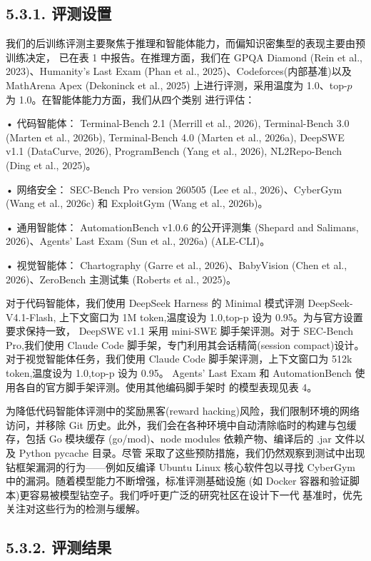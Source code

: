 \subsection{5.3.1. 评测设置}\label{evaluation-setup}

我们的后训练评测主要聚焦于推理和智能体能力，而偏知识密集型的表现主要由预训练决定，
已在表 1 中报告。在推理方面，我们在 GPQA Diamond (Rein et al., 2023)、Humanity's Last
Exam (Phan et al., 2025)、Codeforces(内部基准)以及 MathArena Apex (Dekoninck et al.,
2025) 上进行评测，采用温度为 1.0、top-$p$ 为 1.0。在智能体能力方面，我们从四个类别
进行评估：

• 代码智能体： Terminal-Bench 2.1 (Merrill et al., 2026), Terminal-Bench
3.0 (Marten et al., 2026b), Terminal-Bench 4.0 (Marten et al., 2026a),
DeepSWE v1.1 (DataCurve, 2026), ProgramBench (Yang et al., 2026),
NL2Repo-Bench (Ding et al., 2025)。

• 网络安全： SEC-Bench Pro version 260505 (Lee et al., 2026)、CyberGym
(Wang et al., 2026c) 和 ExploitGym (Wang et al., 2026b)。

• 通用智能体： AutomationBench v1.0.6 的公开评测集 (Shepard and
Salimans, 2026)、Agents' Last Exam (Sun et al., 2026a) (ALE-CLI)。

• 视觉智能体： Chartography (Garre et al., 2026)、BabyVision (Chen et
al., 2026)、ZeroBench 主测试集 (Roberts et al., 2025)。

对于代码智能体，我们使用 DeepSeek Harness 的 Minimal 模式评测 DeepSeek-V4.1-Flash,
上下文窗口为 1M token,温度设为 1.0,top-p 设为 0.95。为与官方设置要求保持一致，
DeepSWE v1.1 采用 mini-SWE 脚手架评测。对于 SEC-Bench Pro,我们使用 Claude Code
脚手架，专门利用其会话精简(session compact)设计。对于视觉智能体任务，我们使用
Claude Code 脚手架评测，上下文窗口为 512k token,温度设为 1.0,top-p 设为 0.95。
Agents' Last Exam 和 AutomationBench 使用各自的官方脚手架评测。使用其他编码脚手架时
的模型表现见表 4。

为降低代码智能体评测中的奖励黑客(reward hacking)风险，我们限制环境的网络访问，并移除
Git 历史。此外，我们会在各种环境中自动清除临时的构建与包缓存，包括 Go 模块缓存
(go/mod)、node modules 依赖产物、编译后的 .jar 文件以及 Python pycache 目录。尽管
采取了这些预防措施，我们仍然观察到测试中出现钻框架漏洞的行为——例如反编译 Ubuntu
Linux 核心软件包以寻找 CyberGym 中的漏洞。随着模型能力不断增强，标准评测基础设施
(如 Docker 容器和验证脚本)更容易被模型钻空子。我们呼吁更广泛的研究社区在设计下一代
基准时，优先关注对这些行为的检测与缓解。



\subsection{5.3.2. 评测结果}\label{evaluation-results-1}

